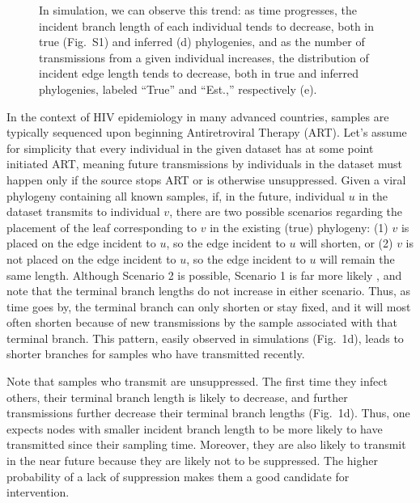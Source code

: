\documentclass[oupdraft]{sysbio}
\newcommand{\PLWH}{sample\xspace}
\begin{document}
\begin{figure}[!tp]
{In simulation, we can observe this trend: as time progresses, the incident branch length of each individual tends to decrease, both in true (Fig.~S1) and inferred (d) phylogenies, and as the number of transmissions from a given individual increases, the distribution of incident edge length tends to decrease, both in true and inferred phylogenies, labeled ``True'' and ``Est.,'' respectively (e).}
\label{fig:diagram}
\end{figure}


In the context of HIV epidemiology in many advanced countries,
\PLWH{s} are typically sequenced
upon beginning Antiretroviral Therapy (ART).
Let's assume for simplicity that every individual in the given dataset has at some point initiated ART,
meaning future transmissions by individuals in the dataset must happen only if the source stops ART or is otherwise unsuppressed. %
Given a viral phylogeny containing all known \PLWH{s},
if, in the future,
individual $u$ in the dataset transmits to individual $v$,
there are two possible scenarios regarding the placement of the leaf corresponding to $v$ in the existing (true) phylogeny:
(1) $v$ is placed on the edge incident to $u$, so the edge incident to $u$ will shorten, or (2) $v$ is not placed on the edge incident to $u$, so the edge incident to $u$ will remain the same length.
Although Scenario 2 is possible,
Scenario 1 is far more likely \citep{Romero-Severson2016}, and note that the terminal branch lengths do not increase in either scenario. 
Thus, as time goes by, the terminal branch can only shorten or stay fixed, and it will most often shorten because of new transmissions by the \PLWH associated with that terminal branch.
This pattern, easily observed in simulations (Fig.~1d), leads to shorter branches for \PLWH{s} who have transmitted recently.

Note that \PLWH{s} who transmit are unsuppressed. The first time they infect others, their terminal branch length is likely to decrease, and further transmissions further decrease their terminal branch lengths (Fig.~1d). 
Thus, one expects nodes with smaller incident branch length to be more likely to have transmitted since their sampling time.
Moreover, they are also likely to transmit in the near future because they are likely not to be  suppressed. 
The higher probability of a lack of suppression makes them a good candidate for intervention. 
\end{document}
